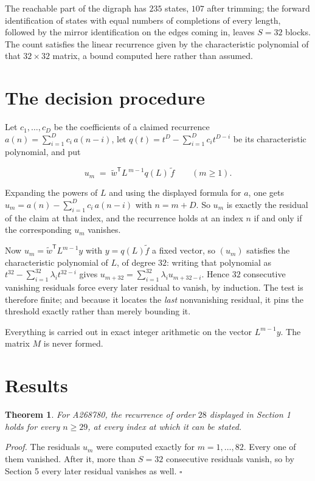 \documentclass[11pt]{article}
\newtheorem{theorem}{Theorem}
\theoremstyle{definition}
\begin{document}
The reachable part of the digraph has $235$ states, $107$ after trimming; the forward identification of states with equal numbers of completions of every length, followed by the mirror identification on the edges coming in, leaves $S = 32$ blocks. The count satisfies the linear recurrence given by the characteristic polynomial of that $32\times32$ matrix, a bound computed here rather than assumed.

\section{The decision procedure}

Let $c_1,\dots,c_D$ be the coefficients of a claimed recurrence $a(n) = \sum_{i=1}^{D} c_i\,a(n-i)$, let $q(t) = t^{D} - \sum_{i=1}^{D} c_i t^{D-i}$ be its characteristic polynomial, and put

\[u_m \;=\; \tilde w^{\mathsf T} L^{\,m-1} q(L)\,\tilde f \qquad (m \ge 1).\]

Expanding the powers of $L$ and using the displayed formula for $a$, one gets $u_m = a(n) - \sum_{i=1}^{D} c_i\,a(n-i)$ with $n = m + D$. So $u_m$ is exactly the residual of the claim at that index, and the recurrence holds at an index $n$ if and only if the corresponding $u_m$ vanishes.

Now $u_m = \tilde w^{\mathsf T} L^{m-1} y$ with $y = q(L)\tilde f$ a fixed vector, so $(u_m)$ satisfies the characteristic polynomial of $L$, of degree $32$: writing that polynomial as $t^{32} - \sum_{i=1}^{32} \lambda_i t^{32-i}$ gives $u_{m+32} = \sum_{i=1}^{32} \lambda_i u_{m+32-i}$. Hence $32$ consecutive vanishing residuals force every later residual to vanish, by induction. The test is therefore finite; and because it locates the {\itshape last} nonvanishing residual, it pins the threshold exactly rather than merely bounding it.

Everything is carried out in exact integer arithmetic on the vector $L^{m-1}y$. The matrix $M$ is never formed.

\section{Results}

\begin{theorem} For A268780, the recurrence of order $28$ displayed in Section 1 holds for every $n \ge 29$, at every index at which it can be stated.\end{theorem}

{\itshape Proof.} The residuals $u_m$ were computed exactly for $m = 1,\dots,82$. Every one of them vanished. After it, more than $S = 32$ consecutive residuals vanish, so by Section 5 every later residual vanishes as well. $\square$
\end{document}

